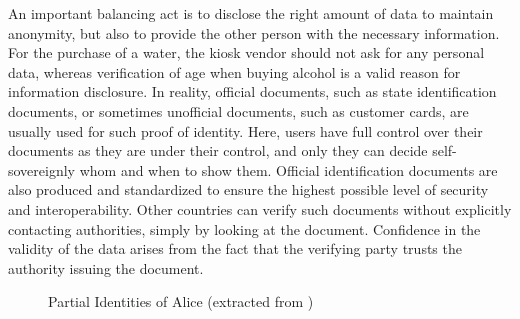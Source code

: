     An important balancing act is to disclose the right amount of data to maintain anonymity, but also to provide the other person with the necessary information. For the purchase of a water, the kiosk vendor should not ask for any personal data, whereas verification of age when buying alcohol is a valid reason for information disclosure. In reality, official documents, such as state identification documents, or sometimes unofficial documents, such as customer cards, are usually used for such proof of identity. Here, users have full control over their documents as they are under their control, and only they can decide self-sovereignly whom and when to show them. Official identification documents are also produced and standardized to ensure the highest possible level of security and interoperability. Other countries can verify such documents without explicitly contacting authorities, simply by looking at the document. Confidence in the validity of the data arises from the fact that the verifying party trusts the authority issuing the document. \cite[p. 6]{struker_grundlagen_2021}
    
    \begin{figure}[ht]
        \centering
        \caption[Partial identities of alice]{Partial Identities of Alice (extracted from \cite{claus_identity_2001})}
        \label{figure: alice}
    \end{figure}

